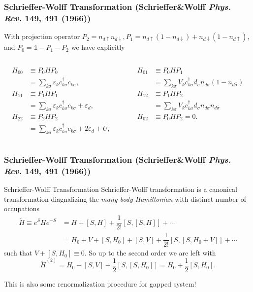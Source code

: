 \documentclass[10pt,aspectratio=43,xcolor=x11names,t]{beamer}%
\begin{document}
		\begin{frame}\frametitle{Schrieffer-Wolff Transformation {\scriptsize(Schrieffer\&Wolff \textit{Phys. Rev.} \textbf{149}, 491 (1966))}}
			
			With projection operator $P_2=n_{d\uparrow}n_{d\downarrow}, P_1=n_{d\uparrow}(1-n_{d\downarrow})+n_{d\downarrow}(1-n_{d\uparrow})$, and $P_0=\mathds{1}-P_1-P_2$ we have explicitly
			\begin{columns}
				\begin{column}{0.5\textwidth}
					\begin{align*}
						H_{00}&\equiv P_0HP_0\\
						&=\sum_{k \sigma}\varepsilon_{k}c_{k\sigma}^\dagger c_{k\sigma},\\
						H_{11}&\equiv P_1HP_1\\
						&=\sum_{k \sigma}\varepsilon_{k}c_{k\sigma}^\dagger c_{k\sigma}+\varepsilon_d,\\
						H_{22}&\equiv P_2HP_2\\
						&=\sum_{k \sigma}\varepsilon_{k}c_{k\sigma}^\dagger c_{k\sigma}+2 \varepsilon_d+U,
					\end{align*}
				\end{column}
				\begin{column}{0.5\textwidth}
					\begin{align*}
						H_{01}&\equiv P_0HP_1\\
						&=\sum_{k\sigma}V_kc_{k\sigma}^\dagger d_\sigma n_{d\sigma}(1-n_{d\bar{\sigma}})\\
						H_{12}&\equiv P_1HP_2\\
						&=\sum_{k\sigma}V_kc_{k\sigma}^\dagger d_\sigma n_{d\sigma}n_{d\bar{\sigma}}\\
						H_{02}&\equiv P_0HP_2=0.
					\end{align*}
				\end{column}
			\end{columns}
		\end{frame}
		\begin{frame}\frametitle{Schrieffer-Wolff Transformation {\scriptsize(Schrieffer\&Wolff \textit{Phys. Rev.} \textbf{149}, 491 (1966))}}
			\begin{block}{Schrieffer-Wolff Transformation}
				Schrieffer-Wolff transformation is a canonical transformation diagnalizing the \emph{many-body Hamiltonian} with distinct number of occupations
				\begin{align*}
					\widetilde{H}\equiv e^{S}He^{-S}&=H+[S,H]+\dfrac{1}{2!}[S,[S,H]]+\cdots\nonumber\\
					&=H_0+V+[S,H_0]+[S,V]+\dfrac{1}{2!}[S,[S,H_0+V]]+\cdots
				\end{align*}
				such that $V+[S,H_0]\equiv0.$ So up to the second order we are left with
				\begin{equation*}
					\widetilde{H}^{(2)}=H_0+[S,V]+\dfrac{1}{2}[S,[S,H_0]]=H_0+\dfrac{1}{2}[S,H_0].
				\end{equation*}
			\end{block}
			\pause
			{\color{red}This is also some renormalization procedure for gapped system!}
		\end{frame}
\end{document}
